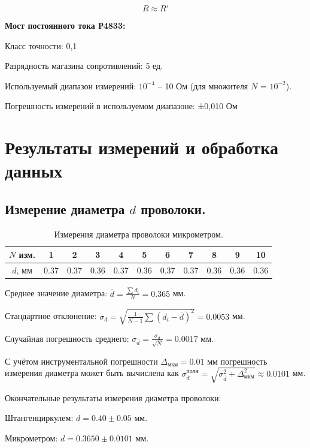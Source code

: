 \documentclass[a4paper, 12pt]{article}
\begin{document}
\[R \approx R'\]

\noindent \textbf{Мост постоянного тока Р4833:}

Класс точности: 0,1

Разрядность магазина сопротивлений: 5 ед.

Используемый диапазон измерений: $10^{-4}$ – 10 Ом (для множителя $N$ = $10^{-2}$).

Погрешность измерений в используемом диапазоне: ±0,010 Ом

\section*{Результаты измерений и обработка данных}

\subsection*{Измерение диаметра $d$ проволоки.}

\begin{table}[!h]
\begin{center}
\begin{tabular}{|c|c|c|c|c|c|c|c|c|c|c|}
\hline
$N$ изм. & 1 & 2 & 3 & 4 & 5 & 6 & 7 & 8 & 9 & 10 \\ \hline
$d$, мм & 0.37 & 0.37 & 0.36 & 0.37 & 0.36 & 0.37 & 0.37 & 0.36 & 0.36 & 0.36 \\ \hline 
\end{tabular}
\caption{Измерения диаметра проволоки микрометром.}
\end{center}
\end{table}

\clearpage

Среднее значение диаметра: $\overline{d}=\frac{\sum d_i}{N}=0.365$ мм.

Стандартное отклонение: $\sigma_d =\sqrt{\frac{1}{N-1}\sum{(d_i-\overline{d})}^2}=0.0053$ мм.

Случайная погрешность среднего: $\sigma_{\overline{d}}=\frac{\sigma_d}{\sqrt{N}}=0.0017$ мм.

С учётом инструментальной погрешности $\Delta_{\text{мкм}}=0.01$ мм погрешность измерения диаметра может быть вычислена как $\sigma^{\text{полн}}_{\overline{d}}=\sqrt{\sigma^2_{\overline{d}}+\Delta_{\text{мкм}}^2}\approx 0.0101$ мм.

Окончательные результаты измерения диаметра проволоки:

Штангенциркулем: $d=0.40 \pm 0.05$ мм.

Микрометром: $d=0.3650 \pm 0.0101$ мм.
\end{document}
